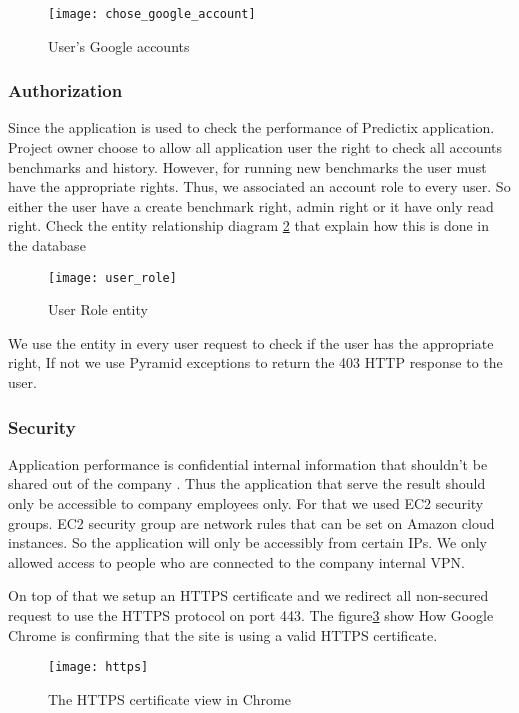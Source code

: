 \begin{figure}[h]
  \centerline{\texttt{[image: chose\_google\_account]}}
\caption{User's Google accounts}
\label{fig:google_auth}
\end{figure}

\subsubsection{Authorization}
Since the application is used to check the performance of Predictix application.
Project owner choose to allow all application user the right to check all
accounts benchmarks and history. However, for running new benchmarks the user
must have the appropriate rights. Thus, we associated an account role to every
user. So either the user have a create benchmark right, admin right or it have
only read right. Check the entity relationship diagram
\hyperref[fig:user_role]{\ref{fig:user_role}} that explain how this is
done in the database
\begin{figure}[h]
  \centerline{\texttt{[image: user\_role]}}
\caption{User Role entity}
\label{fig:user_role}
\end{figure}
We use the entity in every user request to check if the user has the appropriate
right, If not we use Pyramid exceptions to return the 403 HTTP response to the
user.

\subsubsection{Security}
Application performance is confidential internal information that shouldn't be
shared out of the company . Thus the application that serve the result should
only be accessible to company employees only. For that we used EC2 security
groups.
EC2 security group \cite{ec2_sg} are network rules that can be set on Amazon cloud instances.
So the application will only be accessibly from certain IPs. We only allowed
access to people who are connected to the company internal VPN.

On top of that we setup an HTTPS certificate and we redirect all non-secured
request to use the HTTPS protocol on port 443. The
figure\hyperref[fig:https]{\ref{fig:https}} show How Google Chrome is
confirming that the site is using a valid HTTPS certificate.
\begin{figure}[h]
  \centerline{\texttt{[image: https]}}
\caption{The HTTPS certificate view in Chrome}
\label{fig:https}
\end{figure}

